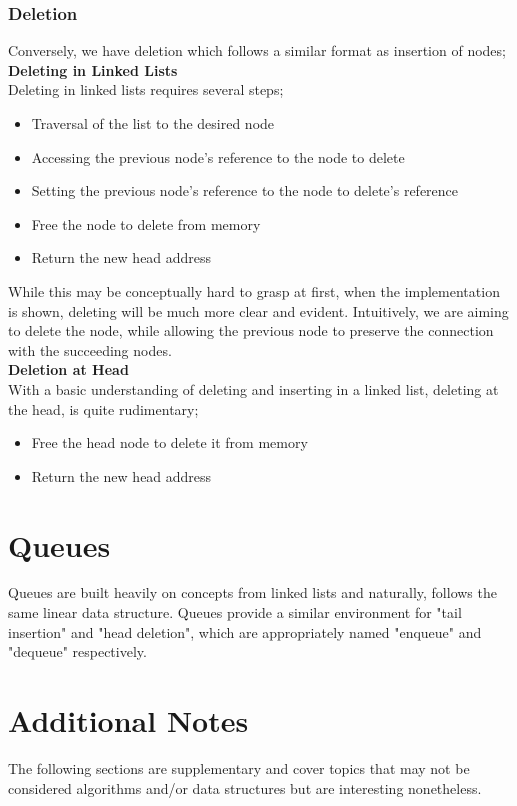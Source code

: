 \documentclass[hidelinks,11pt]{article}
\begin{document}
\subsubsection{Deletion}
Conversely, we have deletion which follows a similar format as insertion of nodes;\\[0.5\baselineskip]
\textbf{Deleting in Linked Lists}\\
Deleting in linked lists requires several steps;
\begin{itemize}
    \item Traversal of the list to the desired node
    \item Accessing the previous node's reference to the node to delete
    \item Setting the previous node's reference to the node to delete's reference 
    \item Free the node to delete from memory
    \item Return the new head address
\end{itemize}
While this may be conceptually hard to grasp at first, when the implementation is shown, deleting will be much more clear and evident. Intuitively, we are aiming to delete the node, while allowing the previous node to preserve the connection with the succeeding nodes.\\[0.5\baselineskip]
\textbf{Deletion at Head}\\
With a basic understanding of deleting and inserting in a linked list, deleting at the head, is quite rudimentary;
\begin{itemize}
    \item Free the head node to delete it from memory
    \item Return the new head address
\end{itemize}

\section{Queues}
Queues are built heavily on concepts from linked lists and naturally, follows the same linear data structure. Queues provide a similar environment for "tail insertion" and "head deletion", which are appropriately named "enqueue" and "dequeue" respectively.
\section{Additional Notes}
The following sections are supplementary and cover topics that may not be considered algorithms and/or data structures but are interesting nonetheless.
\end{document}
